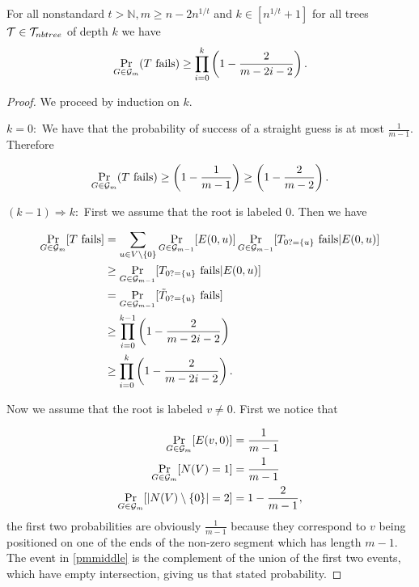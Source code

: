 \begin{lemm}\label{lemmpPATHlowerbound}
For all nonstandard $t>\mathbb{N},m\geq n-2n^{1/t}$ and $k\in [n^{1/t}+1]$ for all trees $\mathcal{T}\in \mathcal{T}_{nbtree}$ of depth $k$ we have
\[
\Pr_{G\in\mathcal{G}_m}(\text{$T$ fails})\geq \prod_{i=0}^k\left (1-\frac{2}{m-2i-2}\right ).
\]
\end{lemm}
\begin{proof}
We proceed by induction on $k$. 

$k=0:$ We have that the probability of success of a straight guess is at most $\frac{1}{m-1}$. Therefore

\begin{align}
\Pr_{G\in\mathcal{G}_m}(\text{$T$ fails})\geq \left (1-\frac{1}{m-1}\right ) \geq \left(1-\frac{2}{m-2}\right).
\end{align}

$(k-1) \Rightarrow k:$ First we assume that the root is labeled $0$. Then we have 

\begin{align}
\Pr_{G\in\mathcal{G}_m}[\text{$T$ fails}]&=\sum_{u\in V\setminus\{0\}}\Pr_{G\in\mathcal{G}_{m-1}}[E(0,u)]\Pr_{G\in\mathcal{G}_{m-1}}[T_{0?=\{u\}}\text{ fails}|E(0,u)]\\
&\geq \Pr_{G\in\mathcal{G}_{m-1}}[T_{0?=\{u\}}\text{ fails}|E(0,u)]\\
&= \Pr_{G\in\mathcal{G}_{m-1}}[\tilde T_{0?=\{u\}}\text{ fails}]\\
&\geq \prod_{i=0}^{k-1}\left(1-\frac{2}{m-2i-2}\right)\\
&\geq \prod_{i=0}^{k}\left(1-\frac{2}{m-2i-2}\right).
\end{align}

Now we assume that the root is labeled $v\not= 0$. First we notice that

\begin{align}
\Pr_{G\in\mathcal{G}_m}[E(v,0)]&=\frac{1}{m-1}\\
\Pr_{G\in\mathcal{G}_m}[N(V)=1]&=\frac{1}{m-1}\\
\Pr_{G\in\mathcal{G}_m}[\left|{N(V)\setminus\{0\}}\right|=2]&=1-\frac{2}{m-1},\label{pmmiddle}
\end{align}
the first two probabilities are obviously $\frac{1}{m-1}$ because they correspond to $v$ being positioned on one of the ends of the non-zero segment which has length $m-1$. The event in \eqref{pmmiddle} is the complement of the union of the first two events, which have empty intersection, giving us that stated probability.


\end{proof}
